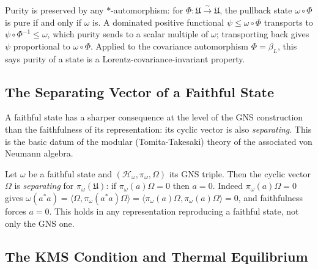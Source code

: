 \begin{theorem}
    \label{thrm:purity-covariance-invariant}
    \leanok
    Purity is preserved by any $*$-automorphism: for $\Phi : \mathfrak{U} \xrightarrow{\sim} \mathfrak{U}$, the pullback state $\omega \circ \Phi$ is pure if and only if $\omega$ is. A dominated positive functional $\psi \le \omega \circ \Phi$ transports to $\psi \circ \Phi^{-1} \le \omega$, which purity sends to a scalar multiple of $\omega$; transporting back gives $\psi$ proportional to $\omega \circ \Phi$. Applied to the covariance automorphism $\Phi = \beta_L$, this says purity of a state is a Lorentz-covariance-invariant property.
\end{theorem}

\subsection{The Separating Vector of a Faithful State}

A faithful state has a sharper consequence at the level of the GNS construction than the faithfulness of its representation: its cyclic vector is also \emph{separating}. This is the basic datum of the modular (Tomita-Takesaki) theory of the associated von Neumann algebra.

\begin{theorem}
    \label{thrm:separating-faithful}
    \leanok
    Let $\omega$ be a faithful state and $(\mathcal{H}_\omega, \pi_\omega, \Omega)$ its GNS triple. Then the cyclic vector $\Omega$ is \emph{separating} for $\pi_\omega(\mathfrak{U})$: if $\pi_\omega(a)\Omega = 0$ then $a = 0$. Indeed $\pi_\omega(a)\Omega = 0$ gives $\omega(a^* a) = \langle \Omega, \pi_\omega(a^* a)\Omega\rangle = \langle \pi_\omega(a)\Omega, \pi_\omega(a)\Omega\rangle = 0$, and faithfulness forces $a = 0$. This holds in any representation reproducing a faithful state, not only the GNS one.
\end{theorem}

\subsection{The KMS Condition and Thermal Equilibrium}

